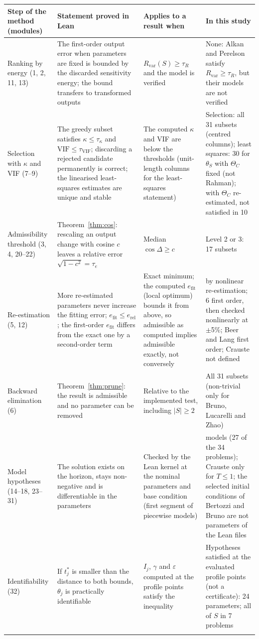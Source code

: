 \begin{tabular}{@{}>{\raggedright\arraybackslash}p{1.9cm}>{\raggedright\arraybackslash}p{3.7cm}>{\raggedright\arraybackslash}p{2.8cm}>{\raggedright\arraybackslash}p{3.4cm}@{}}
\toprule
Step of the method (modules) & Statement proved in Lean & Applies to a result when & In this study \\
\midrule
Ranking by energy (1, 2, 11, 13) & The first-order output error when parameters are fixed is bounded by the discarded sensitivity energy; the bound transfers to transformed outputs & $R_{\mathrm{var}}(S)\ge\tau_R$ and the model is verified & None: Alkan and Perelson satisfy $R_{\mathrm{var}}\ge\tau_R$, but their models are not verified \\
\addlinespace[3pt]
Selection with $\kappa$ and VIF (7--9) & The greedy subset satisfies $\kappa\le\tau_\kappa$ and $\mathrm{VIF}\le\tau_{\mathrm{VIF}}$; discarding a rejected candidate permanently is correct; the linearised least-squares estimates are unique and stable & The computed $\kappa$ and VIF are below the thresholds (unit-length columns for the least-squares statement) & Selection: all 31 subsets (centred columns); least squares: 30 for $\theta_S$ with $\Theta_C$ fixed (not Rahman); with $\Theta_C$ re-estimated, not satisfied in 10 \\
\addlinespace[3pt]
Admissibility threshold (3, 4, 20--22) & Theorem~\ref{thm:cos}: rescaling an output change with cosine $c$ leaves a relative error $\sqrt{1-c^2}=\tau_e$ & Median $\cos\Delta\ge c$ & Level 2 or 3: 17 subsets \\
\addlinespace[3pt]
Re-estimation (5, 12) & More re-estimated parameters never increase the fitting error; $e_{\mathrm{fit}}\le e_{\mathrm{rel}}$; the first-order $e_{\mathrm{fit}}$ differs from the exact one by a second-order term & Exact minimum; the computed $e_{\mathrm{fit}}$ (local optimum) bounds it from above, so admissible as computed implies admissible exactly, not conversely & 25 by nonlinear re-estimation; 6 first order, then checked nonlinearly at $\pm$5\%; Beer and Lang first order; Crauste not defined \\
\addlinespace[3pt]
Backward elimination (6) & Theorem~\ref{thm:prune}: the result is admissible and no parameter can be removed & Relative to the implemented test, including $|S|\ge2$ & All 31 subsets (non-trivial only for Bruno, Lucarelli and Zhao) \\
\addlinespace[3pt]
Model hypotheses (14--18, 23--31) & The solution exists on the horizon, stays non-negative and is differentiable in the parameters & Checked by the Lean kernel at the nominal parameters and base condition (first segment of piecewise models) & 28 models (27 of the 34 problems); Crauste only for $T\le1$; the selected initial conditions of Bertozzi and Bruno are not parameters of the Lean files \\
\addlinespace[3pt]
Identifiability (32) & If $t^{\ast}_j$ is smaller than the distance to both bounds, $\theta_j$ is practically identifiable & $I_j$, $\gamma$ and $\varepsilon$ computed at the profile points satisfy the inequality & Hypotheses satisfied at the evaluated profile points (not a certificate): 24 parameters; all of $S$ in 7 problems \\
\botrule
\end{tabular}
